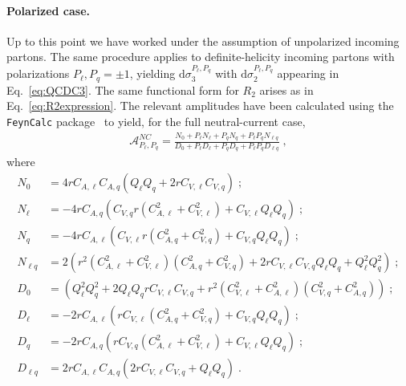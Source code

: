 \documentclass[a4paper,11pt]{article}
\begin{document}
\paragraph{Polarized case.}
Up to this point we have worked under the assumption of unpolarized incoming partons. The same procedure applies to definite-helicity incoming partons with polarizations $P_\ell, P_q=\pm 1$, yielding $\mathrm{d} \sigma_3^{P_\ell,P_q}$ with $\mathrm{d}\sigma_2^{P_\ell,P_q}$ appearing in Eq.~\eqref{eq:QCDC3}. The same functional form for $R_2$ arises as in Eq.~\eqref{eq:R2expression}. The relevant amplitudes have been calculated using the \texttt{FeynCalc} package~\cite{Mertig:1990an,Shtabovenko:2016sxi,Shtabovenko:2020gxv,Shtabovenko:2023idz} to yield, for the full neutral-current case,
\begin{align}\label{eq:APol}
\mathcal{A}^{NC}_{P_\ell,P_q} = \frac{ N_0 + P_\ell N_\ell + P_q N_q + P_\ell P_q N_{\ell q}} {D_0 + P_\ell D_\ell + P_q D_q + P_\ell P_q D_{\ell q} }\;,
\end{align}
where
\begin{align}\label{eq:NDsA}
N_0 &= 4 r C_{A,\ell} C_{A,q} \left(Q_\ell Q_q+2rC_{V,\ell}C_{V,q} \right)\;;\\
N_\ell &= -4r C_{A,q}  (C_{V,q} r (C_{A,\ell}^2+C_{V,\ell}^2)+C_{V,\ell} Q_\ell Q_q)\;;\\
N_q &= -4r C_{A,\ell} (C_{V,\ell} r (C_{A,q}^2+C_{V,q}^2)+C_{V,q} Q_\ell Q_q)\;; \\
N_{\ell q} &= 2 \left(r^2 (C_{A,\ell}^2+C_{V,\ell}^2) (C_{A,q}^2+C_{V,q}^2)+2r C_{V,\ell} C_{V,q} Q_\ell Q_q  + Q_\ell^2 Q_q^2\right)\;;\\
D_0 &= \left(Q_\ell^2Q_q^2+2Q_\ell Q_q rC_{V,\ell}C_{V,q}
+r^2\left(C^2_{V,\ell}+C^2_{A,\ell}\right)\left(C^2_{V,q   }+C^2_{A,q   }\right)\right)\;; \\
D_\ell &= -2r C_{A,\ell} \left(rC_{V,\ell} (C_{A,q}^2+C_{V,q}^2)+C_{V,q} Q_\ell Q_q\right)\;; \\
D_q &= -2r C_{A,q} \left( r C_{V,q} (C_{A,\ell}^2+C_{V,\ell}^2)+C_{V,\ell} Q_\ell Q_q\right)\;;\\
D_{\ell q} &= 2r C_{A,\ell} C_{A,q} (2r C_{V,\ell} C_{V,q} + Q_\ell Q_q)\;.\label{eq:NDsAFinal}
\end{align}
\end{document}
